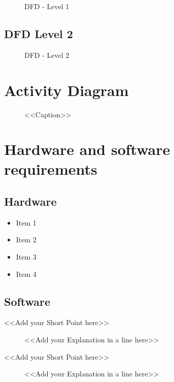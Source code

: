 \begin{figure}[H]
\centering
\caption{DFD - Level 1}
\label{fig:dfd1}
\end{figure}

\subsection{DFD Level 2}

\begin{figure}[H]
\centering
\caption{DFD - Level 2}
\label{fig:dfd2}
\end{figure}

\section{Activity Diagram}

\begin{figure}[H]
\centering
\caption{<<Caption>>}
\label{<<Label>>}
\end{figure}


\section{Hardware and software requirements}
\subsection{Hardware}

\begin{itemize}
\item{Item 1}
\item{Item 2}
\item{Item 3}
\item{Item 4}
\end{itemize}
\subsection{Software}

\begin{description}
\item[<<Add your Short Point here>>] <<Add your Explanation in a line here>>
\item[<<Add your Short Point here>>] <<Add your Explanation in a line here>>
\end{description}

